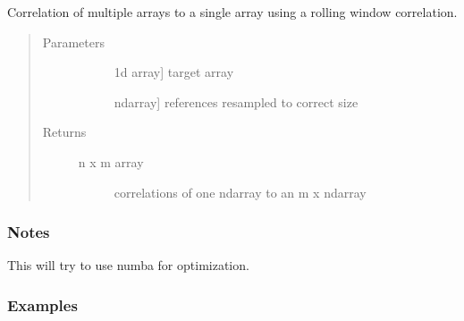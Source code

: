 \documentclass[letterpaper,10pt,english]{sphinxmanual}
\begin{document}
\begin{fulllineitems}
\label{\detokenize{generated/seg1d.optimized_funcs.rcor:seg1d.optimized_funcs.rcor}}
\sphinxAtStartPar
Correlation of multiple arrays to a single array using a rolling
window correlation.
\begin{quote}\begin{description}
\item[{Parameters}] \leavevmode\begin{description}
\item[{}] \leavevmode{[}1d array{]}
\sphinxAtStartPar
target array

\item[{}] \leavevmode{[}ndarray{]}
\sphinxAtStartPar
references resampled to correct size

\end{description}

\item[{Returns}] \leavevmode\begin{description}
\item[{n x m array}] \leavevmode
\sphinxAtStartPar
correlations of one ndarray to an m x ndarray

\end{description}

\end{description}\end{quote}
\subsubsection*{Notes}

\sphinxAtStartPar
This will try to use numba for optimization.
\subsubsection*{Examples}

\begin{sphinxVerbatim}[commandchars=\\\{\}]
   
   
\end{sphinxVerbatim}


\end{fulllineitems}
\end{document}
